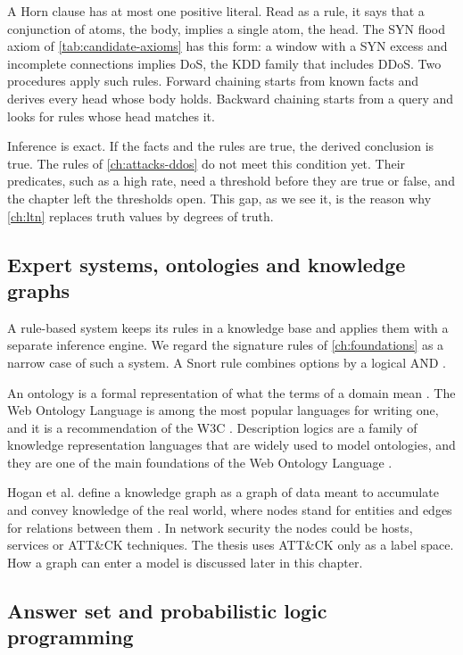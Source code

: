 A Horn clause has at most one positive literal. Read as a rule, it says that
a conjunction of atoms, the body, implies a single atom, the head. The SYN
flood axiom of \cref{tab:candidate-axioms} has this form: a window with a SYN
excess and incomplete connections implies DoS, the KDD family that includes
DDoS. Two procedures apply such
rules. Forward chaining starts from known facts and derives every head whose
body holds. Backward chaining starts from a query and looks for rules whose
head matches it.

Inference is exact. If the facts and the rules are true, the derived
conclusion is true. The rules of \cref{ch:attacks-ddos} do not meet this
condition yet. Their predicates, such as a high rate, need a threshold before
they are true or false, and the chapter left the thresholds open. This gap,
as we see it, is the reason why \cref{ch:ltn} replaces truth values by degrees
of truth.

\subsection{Expert systems, ontologies and knowledge graphs}
\label{sec:rules-ontologies-kg}

A rule-based system keeps its rules in a knowledge base and applies them with
a separate inference engine. We regard the signature rules of
\cref{ch:foundations} as a narrow case of such a system. A Snort rule combines
options by a logical AND \citep{roesch1999snort}.

An ontology is a formal representation of what the terms of a domain mean
\citep{hogan2021knowledge}. The Web Ontology Language is among the most
popular languages for writing one, and it is a recommendation of the W3C
\citep{hogan2021knowledge}. Description logics are a family of knowledge
representation languages that are widely used to model ontologies, and they
are one of the main foundations of the Web Ontology Language
\citep{krotzsch2012primer}.

Hogan et al. define a knowledge graph as a graph of data meant to accumulate
and convey knowledge of the real world, where nodes stand for entities and
edges for relations between them \citep{hogan2021knowledge}. In network
security the nodes could be hosts, services or ATT\&CK techniques. The
thesis uses ATT\&CK only as a label space. How a graph can enter a model is
discussed later in this chapter.

\subsection{Answer set and probabilistic logic programming}
\label{sec:asp-plp}

